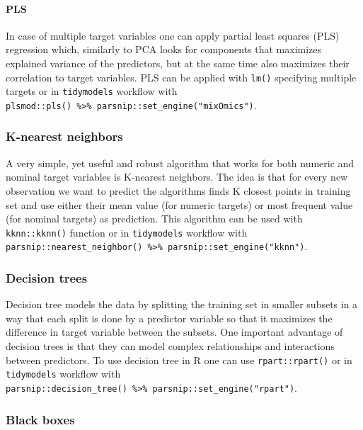 \documentclass[
]{book}
\begin{document}
\hypertarget{pls}{%
\paragraph{PLS}\label{pls}}

In case of multiple target variables one can apply partial least squares (PLS) regression
which, similarly to PCA looks for components that maximizes explained variance of
the predictors, but at the same time also maximizes their correlation to target variables.
PLS can be applied with \texttt{lm()} specifying multiple targets or in \texttt{tidymodels} workflow
with \texttt{plsmod::pls()\ \%\textgreater{}\%\ parsnip::set\_engine("mixOmics")}.

\hypertarget{k-nearest-neighbors}{%
\subsubsection{K-nearest neighbors}\label{k-nearest-neighbors}}

A very simple, yet useful and robust algorithm that works for both numeric and nominal
target variables is K-nearest neighbors. The idea is that for every new observation
we want to predict the algorithms finds K closest points in training set and use
either their mean value (for numeric targets) or most frequent value (for nominal targets) as prediction. This algorithm can be used with \texttt{kknn::kknn()} function or in \texttt{tidymodels} workflow
with \texttt{parsnip::nearest\_neighbor()\ \%\textgreater{}\%\ parsnip::set\_engine("kknn")}.

\hypertarget{decision-trees}{%
\subsubsection{Decision trees}\label{decision-trees}}

Decision tree models the data by splitting the training set in smaller subsets
in a way that each split is done by a predictor variable so that it maximizes
the difference in target variable between the subsets. One important advantage
of decision trees is that they can model complex relationships and interactions
between predictors. To use decision tree in R one can use \texttt{rpart::rpart()} or
in \texttt{tidymodels} workflow with \texttt{parsnip::decision\_tree()\ \%\textgreater{}\%\ parsnip::set\_engine("rpart")}.

\hypertarget{black-boxes}{%
\subsubsection{Black boxes}\label{black-boxes}}
\end{document}
